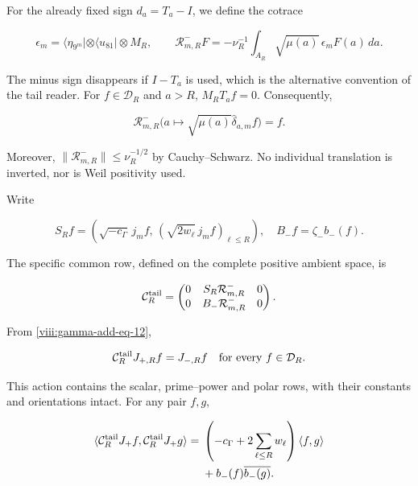 For the already fixed sign \(d_a=T_a-I\), we define the cotrace

\begin{equation}
\epsilon_m=\langle\eta_{9^m}|\otimes\langle u_{81}|\otimes M_R,
\qquad
\mathcal R^-_{m,R}F
=-\nu_R^{-1}\int_{A_R}\sqrt{\mu(a)}\,\epsilon_m F(a)\,da.
\label{viii:gamma-add-eq-11}
\end{equation}

The minus sign disappears if \(I-T_a\) is used, which is the alternative convention of the tail reader. For \(f\in\mathcal D_R\) and \(a>R\), \(M_RT_af=0\). Consequently,

\begin{equation}
\mathcal R^-_{m,R}
\bigl(a\mapsto\sqrt{\mu(a)}\widehat\delta_{a,m}f\bigr)=f.
\label{viii:gamma-add-eq-12}
\end{equation}
\label{viii:gamma-add:cola-lector}

Moreover, \(\|\mathcal R^-_{m,R}\|\le\nu_R^{-1/2}\) by Cauchy--Schwarz. No individual translation is inverted, nor is Weil positivity used.

Write

\begin{equation}
S_Rf=\left(\sqrt{-c_\Gamma}\,j_mf,\,
              (\sqrt{2w_\ell}\,j_mf)_{\ell\le R}\right),
\quad B_-f=\zeta_-b_-(f).
\label{viii:gamma-add-display-28}
\end{equation}

The specific common row, defined on the complete positive ambient space, is

\begin{equation}
\mathcal C_R^{\rm tail}
=
\begin{pmatrix}
0&S_R\mathcal R^-_{m,R}&0\\
0&B_-\mathcal R^-_{m,R}&0
\end{pmatrix}.
\label{viii:gamma-add-eq-13}
\end{equation}

From \eqref{viii:gamma-add-eq-12},

\begin{equation}
\mathcal C_R^{\rm tail}J_{+,R}f=J_{-,R}f
\quad\hbox{for every }f\in\mathcal D_R.
\label{viii:gamma-add-eq-14}
\end{equation}

This action contains the scalar, prime--power and polar rows, with their constants and orientations intact. For any pair \(f,g\),

\begin{equation}
\begin{aligned}
\langle\mathcal C_R^{\rm tail}J_+f,\mathcal C_R^{\rm tail}J_+g\rangle
={}&\left(-c_\Gamma+2\sum_{\ell\le R}w_\ell\right)\langle f,g\rangle\\
&+b_-(f)\overline{b_-(g)}.
\end{aligned}
\label{viii:gamma-add-eq-15}
\end{equation}

